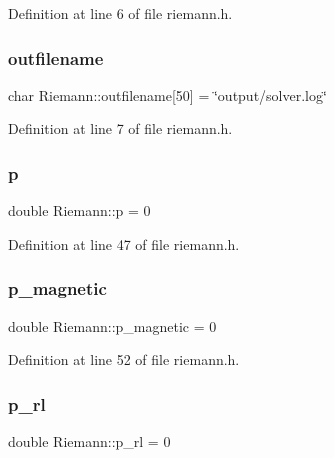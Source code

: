 Definition at line 6 of file riemann.\+h.

\mbox{\label{classRiemann_a80144acbc28f1d38e813f3912bf2e336}} 
\subsubsection{\texorpdfstring{outfilename}{outfilename}}
{\footnotesize\ttfamily char Riemann\+::outfilename\mbox{[}50\mbox{]} = \char`\"{}output/solver.\+log\char`\"{}\hspace{0.3cm}{\ttfamily [private]}}



Definition at line 7 of file riemann.\+h.

\mbox{\label{classRiemann_ad5cdb1fbb2149bcbdbfea4591d235412}} 
\subsubsection{\texorpdfstring{p}{p}}
{\footnotesize\ttfamily double Riemann\+::p = 0\hspace{0.3cm}{\ttfamily [private]}}



Definition at line 47 of file riemann.\+h.

\mbox{\label{classRiemann_ae942c6053a769d20c4adfd20781b3173}} 
\subsubsection{\texorpdfstring{p\+\_\+magnetic}{p\_magnetic}}
{\footnotesize\ttfamily double Riemann\+::p\+\_\+magnetic = 0\hspace{0.3cm}{\ttfamily [private]}}



Definition at line 52 of file riemann.\+h.

\mbox{\label{classRiemann_acc72f10af19015784ef3b24b4f816651}} 
\subsubsection{\texorpdfstring{p\+\_\+rl}{p\_rl}}
{\footnotesize\ttfamily double Riemann\+::p\+\_\+rl = 0\hspace{0.3cm}{\ttfamily [private]}}



